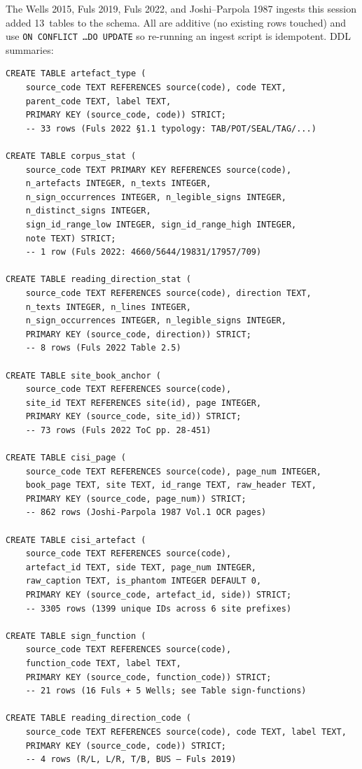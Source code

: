 The Wells 2015, Fuls 2019, Fuls 2022, and Joshi--Parpola 1987 ingests
this session added 13~tables to the schema. All are additive (no
existing rows touched) and use \texttt{ON CONFLICT \ldots DO UPDATE}
so re-running an ingest script is idempotent. DDL summaries:

{\small
\begin{verbatim}
CREATE TABLE artefact_type (
    source_code TEXT REFERENCES source(code), code TEXT,
    parent_code TEXT, label TEXT,
    PRIMARY KEY (source_code, code)) STRICT;
    -- 33 rows (Fuls 2022 §1.1 typology: TAB/POT/SEAL/TAG/...)

CREATE TABLE corpus_stat (
    source_code TEXT PRIMARY KEY REFERENCES source(code),
    n_artefacts INTEGER, n_texts INTEGER,
    n_sign_occurrences INTEGER, n_legible_signs INTEGER,
    n_distinct_signs INTEGER,
    sign_id_range_low INTEGER, sign_id_range_high INTEGER,
    note TEXT) STRICT;
    -- 1 row (Fuls 2022: 4660/5644/19831/17957/709)

CREATE TABLE reading_direction_stat (
    source_code TEXT REFERENCES source(code), direction TEXT,
    n_texts INTEGER, n_lines INTEGER,
    n_sign_occurrences INTEGER, n_legible_signs INTEGER,
    PRIMARY KEY (source_code, direction)) STRICT;
    -- 8 rows (Fuls 2022 Table 2.5)

CREATE TABLE site_book_anchor (
    source_code TEXT REFERENCES source(code),
    site_id TEXT REFERENCES site(id), page INTEGER,
    PRIMARY KEY (source_code, site_id)) STRICT;
    -- 73 rows (Fuls 2022 ToC pp. 28-451)

CREATE TABLE cisi_page (
    source_code TEXT REFERENCES source(code), page_num INTEGER,
    book_page TEXT, site TEXT, id_range TEXT, raw_header TEXT,
    PRIMARY KEY (source_code, page_num)) STRICT;
    -- 862 rows (Joshi-Parpola 1987 Vol.1 OCR pages)

CREATE TABLE cisi_artefact (
    source_code TEXT REFERENCES source(code),
    artefact_id TEXT, side TEXT, page_num INTEGER,
    raw_caption TEXT, is_phantom INTEGER DEFAULT 0,
    PRIMARY KEY (source_code, artefact_id, side)) STRICT;
    -- 3305 rows (1399 unique IDs across 6 site prefixes)

CREATE TABLE sign_function (
    source_code TEXT REFERENCES source(code),
    function_code TEXT, label TEXT,
    PRIMARY KEY (source_code, function_code)) STRICT;
    -- 21 rows (16 Fuls + 5 Wells; see Table sign-functions)

CREATE TABLE reading_direction_code (
    source_code TEXT REFERENCES source(code), code TEXT, label TEXT,
    PRIMARY KEY (source_code, code)) STRICT;
    -- 4 rows (R/L, L/R, T/B, BUS — Fuls 2019)


\end{verbatim}}

